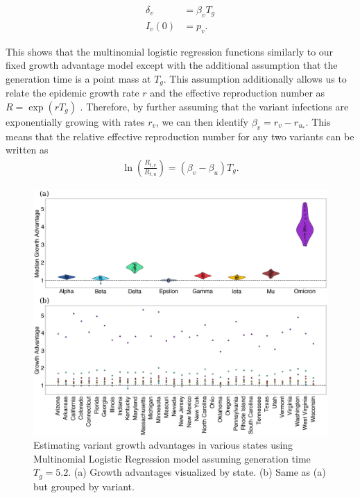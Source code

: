 \documentclass[11pt,oneside,letterpaper]{article}
\begin{document}
\begin{align}
  \delta_{v} &= \beta_{v}T_{g}\\
  I_{v}(0) &= p_{v}.
\end{align}

This shows that the multinomial logistic regression functions similarly to our fixed growth advantage model except with the additional assumption that the generation time is a point mass at $T_{g}$.
This assumption additionally allows us to relate the epidemic growth rate $r$ and the effective reproduction number as $R = \exp(r T_{g})$ \cite{Wallinga2006}.
Therefore, by further assuming that the variant infections are exponentially growing with rates $r_{v}$, we can then identify $\beta_{v} = r_{v} - r_{u_{*}}$.
This means that the relative effective reproduction number for any two variants can be written as
\begin{align*}
\ln \left( \frac{R_{t,v}}{R_{t,u}} \right) = (\beta_{v} - \beta_{u}) T_{g}.
\end{align*}

\begin{figure}
  \centering
  \includegraphics[width=\linewidth]{figs/fig_MLR_growth_advantages_supp.png}
  \caption{Estimating variant growth advantages in various states using Multinomial Logistic Regression model assuming generation time $T_{g} = 5.2$.
  (a) Growth advantages visualized by state.
  (b) Same as (a) but grouped by variant.}%
  \label{fig:MLR_growth_advantages}
\end{figure}
\end{document}
